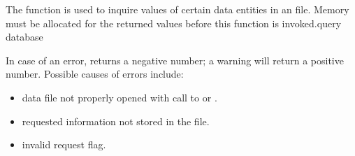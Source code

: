 The function  is used to inquire values of certain
data entities in an \exo{} file. Memory must be allocated for the
returned values before this function is invoked.query database


In case of an error,  returns a negative
number; a warning will return a positive number.
Possible causes of errors include:

\begin{itemize}
 \item data file not properly opened with call to  or
 .
 \item requested information not stored in the file.
 \item invalid request flag.
\end{itemize}



